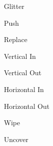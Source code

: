 \documentclass{beamer}
\begin{document}
\begin{frame}
    \transglitter[direction=315]
    Glitter
\end{frame}

\begin{frame}
    \transpush[direction=90]
    Push
\end{frame}

\begin{frame}
    \transreplace
    Replace
\end{frame}

\begin{frame}
    \transsplitverticalin
    Vertical In
\end{frame}

\begin{frame}
    \transsplitverticalout
    Vertical Out
\end{frame}

\begin{frame}
    \transsplithorizontalin
    Horizontal In
\end{frame}

\begin{frame}
    \transsplithorizontalout
    Horizontal Out
\end{frame}

\begin{frame}
    \transwipe[direction=180]
    Wipe
\end{frame}

\begin{frame}
    \transuncover[direction=270]
    Uncover
\end{frame}
\end{document}
